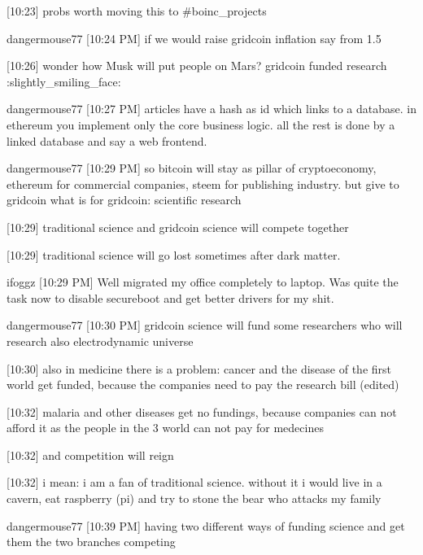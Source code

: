 {[10:23] 
probs worth moving this to #boinc_projects


dangermouse77 [10:24 PM] 
if we would raise gridcoin inflation say from 1.5%


[10:26] 
wonder how Musk will put people on Mars? gridcoin funded research :slightly_smiling_face:


dangermouse77 [10:27 PM] 
articles have a hash as id which links to a database. in ethereum you implement only the core business logic. all the rest is done by a linked database and say a web frontend.


dangermouse77 [10:29 PM] 
so bitcoin will stay as pillar of cryptoeconomy, ethereum for commercial companies, steem for publishing industry. but give to gridcoin what is for gridcoin: scientific research


[10:29] 
traditional science and gridcoin science will compete together


[10:29] 
traditional science will go lost sometimes after dark matter.


ifoggz
[10:29 PM] 
Well migrated my office completely to laptop. Was quite the task now to disable secureboot and get better drivers for my shit.


dangermouse77 [10:30 PM] 
gridcoin science will fund some researchers who will research also electrodynamic universe


[10:30] 
also in medicine there is a problem: cancer and the disease of the first world get funded, because the companies need to pay the research bill (edited)


[10:32] 
malaria and other diseases get no fundings, because companies can not afford it as the people in the 3 world can not pay for medecines


[10:32] 
and competition will reign


[10:32] 
i mean: i am a fan of traditional science. without it i would live in a cavern, eat raspberry (pi) and try to stone the bear who attacks my family


dangermouse77 [10:39 PM] 
having two different ways of funding science and get them the two branches competing


}
